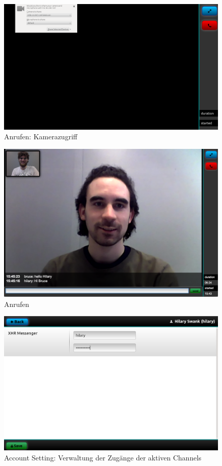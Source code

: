 	\begin{figure}[H]
		\centering
		\includegraphics[height=0.4\textheight]{../ui/img/finalUi/cameraAccess.png}
		\caption[Camera access screen]{Anrufen: Kamerazugriff}
		\label{phone screen camera access}
	\end{figure}
	\begin{figure}[H]
		\centering
		\includegraphics[height=0.45\textheight]{../ui/img/finalUi/phoneView.png}
		\caption[Call screen]{Anrufen}
		\label{phone screen}
	\end{figure}
	\begin{figure}[H]
		\centering
		\includegraphics[height=0.4\textheight]{../ui/img/finalUi/accountEditView.png}
		\caption[Channel edit screen]{Account Setting: Verwaltung der Zugänge der aktiven Channels}
		\label{account edit screen}
	\end{figure}